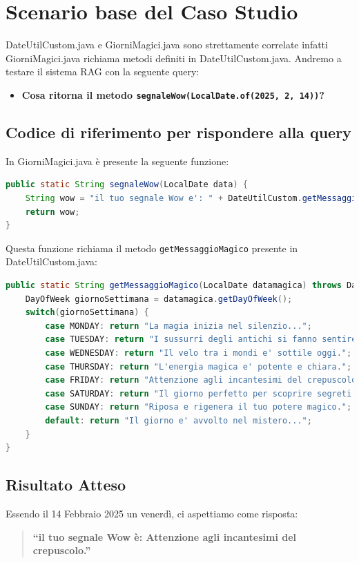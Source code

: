 \documentclass[12pt,a4paper,openright,twoside]{book}
\begin{document}
\section{Scenario base del Caso Studio}
DateUtilCustom.java e GiorniMagici.java sono strettamente correlate infatti GiorniMagici.java richiama metodi definiti in DateUtilCustom.java.
Andremo a testare il sistema RAG con la seguente query: 
\begin{itemize}
    \item \textbf{Cosa ritorna il metodo \texttt{segnaleWow(LocalDate.of(2025, 2, 14))}?}
\end{itemize}

\subsection{Codice di riferimento per rispondere alla query}
In GiorniMagici.java è presente la seguente funzione:
\begin{lstlisting}[language=Java, caption={Metodo segnaleWow in GiorniMagici.java}, label={lst:segnaleWow}]
public static String segnaleWow(LocalDate data) {
    String wow = "il tuo segnale Wow e': " + DateUtilCustom.getMessaggioMagico(date);
    return wow;
}
\end{lstlisting}
Questa funzione richiama il metodo \texttt{getMessaggioMagico} presente in DateUtilCustom.java:

\begin{lstlisting}[language=Java, caption={Metodo getMessaggioMagico in DateUtilCustom.java}, label={lst:getMessaggioMagico}]
public static String getMessaggioMagico(LocalDate datamagica) throws DateTimeParseException {
    DayOfWeek giornoSettimana = datamagica.getDayOfWeek();
    switch(giornoSettimana) {
        case MONDAY: return "La magia inizia nel silenzio...";
        case TUESDAY: return "I sussurri degli antichi si fanno sentire.";
        case WEDNESDAY: return "Il velo tra i mondi e' sottile oggi.";
        case THURSDAY: return "L'energia magica e' potente e chiara.";
        case FRIDAY: return "Attenzione agli incantesimi del crepuscolo.";
        case SATURDAY: return "Il giorno perfetto per scoprire segreti nascosti.";
        case SUNDAY: return "Riposa e rigenera il tuo potere magico.";
        default: return "Il giorno e' avvolto nel mistero...";
    }
}
\end{lstlisting}

\subsection{Risultato Atteso}
Essendo il 14 Febbraio 2025 un venerdì, ci aspettiamo come risposta:
\begin{quote}
    \textbf{``il tuo segnale Wow è: Attenzione agli incantesimi del crepuscolo.''}
\end{quote}
\end{document}
